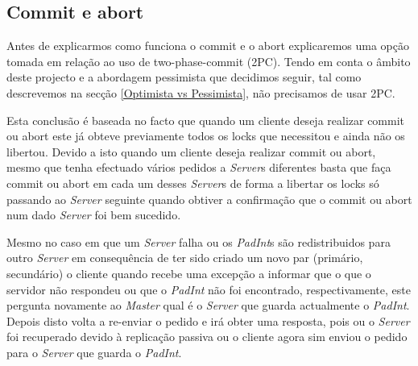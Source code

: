 \subsection{Commit e abort}

Antes de explicarmos como funciona o commit e o abort explicaremos uma opção tomada em relação ao uso de two-phase-commit (2PC). Tendo em conta o âmbito deste projecto e a abordagem pessimista que decidimos seguir, tal como descrevemos na secção \ref{Optimista vs Pessimista}, não precisamos de usar 2PC.

Esta conclusão é baseada no facto que quando um cliente deseja realizar commit ou abort este já obteve previamente todos os locks que necessitou e ainda não os libertou. Devido a isto quando um cliente deseja realizar commit ou abort, mesmo que tenha efectuado vários pedidos a \textit{Server}s diferentes basta que faça commit ou abort em cada um desses \textit{Server}s de forma a libertar os locks só passando ao \textit{Server} seguinte quando obtiver a confirmação que o commit ou abort num dado \textit{Server} foi bem sucedido.

Mesmo no caso em que um \textit{Server} falha ou os \textit{PadInt}s são redistribuidos para outro \textit{Server} em consequência de ter sido criado um novo par (primário, secundário) o cliente quando recebe uma excepção a informar que o que o servidor não respondeu ou que o \textit{PadInt} não foi encontrado, respectivamente, este pergunta novamente ao \textit{Master} qual é o \textit{Server} que guarda actualmente o \textit{PadInt}. Depois disto volta a re-enviar o pedido e irá obter uma resposta, pois ou o \textit{Server} foi recuperado devido à replicação passiva ou o cliente agora sim enviou o pedido para o \textit{Server} que guarda o \textit{PadInt}.


